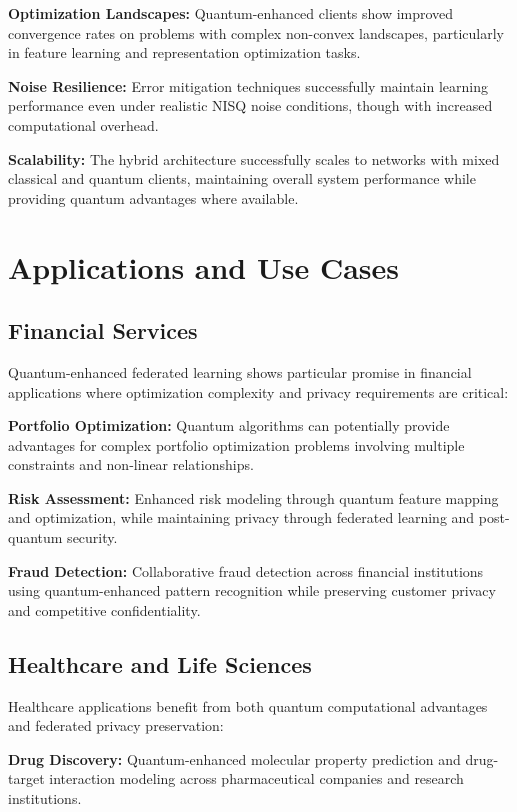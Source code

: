\documentclass[10pt,journal,compsoc]{IEEEtran}
\begin{document}
\textbf{Optimization Landscapes:} Quantum-enhanced clients show improved convergence rates on problems with complex non-convex landscapes, particularly in feature learning and representation optimization tasks.

\textbf{Noise Resilience:} Error mitigation techniques successfully maintain learning performance even under realistic NISQ noise conditions, though with increased computational overhead.

\textbf{Scalability:} The hybrid architecture successfully scales to networks with mixed classical and quantum clients, maintaining overall system performance while providing quantum advantages where available.

\section{Applications and Use Cases}

\subsection{Financial Services}

Quantum-enhanced federated learning shows particular promise in financial applications where optimization complexity and privacy requirements are critical:

\textbf{Portfolio Optimization:} Quantum algorithms can potentially provide advantages for complex portfolio optimization problems involving multiple constraints and non-linear relationships.

\textbf{Risk Assessment:} Enhanced risk modeling through quantum feature mapping and optimization, while maintaining privacy through federated learning and post-quantum security.

\textbf{Fraud Detection:} Collaborative fraud detection across financial institutions using quantum-enhanced pattern recognition while preserving customer privacy and competitive confidentiality.

\subsection{Healthcare and Life Sciences}

Healthcare applications benefit from both quantum computational advantages and federated privacy preservation:

\textbf{Drug Discovery:} Quantum-enhanced molecular property prediction and drug-target interaction modeling across pharmaceutical companies and research institutions.
\end{document}
